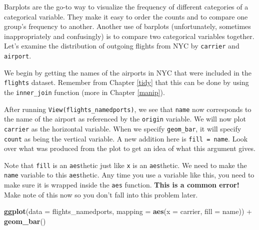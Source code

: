 \documentclass[]{tufte-book}
\newenvironment{Shaded}{\begin{snugshade}}{\end{snugshade}}
\newcommand{\KeywordTok}[1]{\textcolor[rgb]{0.13,0.29,0.53}{\textbf{{#1}}}}
\newcommand{\DataTypeTok}[1]{\textcolor[rgb]{0.13,0.29,0.53}{{#1}}}
\newcommand{\StringTok}[1]{\textcolor[rgb]{0.31,0.60,0.02}{{#1}}}
\newcommand{\NormalTok}[1]{{#1}}
\theoremstyle{definition}
\theoremstyle{definition}
\theoremstyle{remark}
\begin{document}
Barplots are the go-to way to visualize the frequency of different
categories of a categorical variable. They make it easy to order the
counts and to compare one group's frequency to another. Another use of
barplots (unfortunately, sometimes inappropriately and confusingly) is
to compare two categorical variables together. Let's examine the
distribution of outgoing flights from NYC by \texttt{carrier} and
\texttt{airport}.

We begin by getting the names of the airports in NYC that were included
in the \texttt{flights} dataset. Remember from Chapter \ref{tidy} that
this can be done by using the \texttt{inner\_join} function (more in
Chapter \ref{manip}).

\begin{Shaded}
\end{Shaded}

After running \texttt{View(flights\_namedports)}, we see that
\texttt{name} now corresponds to the name of the airport as referenced
by the \texttt{origin} variable. We will now plot \texttt{carrier} as
the horizontal variable. When we specify \texttt{geom\_bar}, it will
specify \texttt{count} as being the vertical variable. A new addition
here is \texttt{fill\ =\ name}. Look over what was produced from the
plot to get an idea of what this argument gives.

Note that \texttt{fill} is an \texttt{aes}thetic just like \texttt{x} is
an \texttt{aes}thetic. We need to make the \texttt{name} variable to
this \texttt{aes}thetic. Any time you use a variable like this, you need
to make sure it is wrapped inside the \texttt{aes} function.
\textbf{This is a common error!} Make note of this now so you don't fall
into this problem later.

\begin{Shaded}
\begin{Highlighting}[]
\KeywordTok{ggplot}\NormalTok{(}\DataTypeTok{data =} \NormalTok{flights_namedports, }\DataTypeTok{mapping =} \KeywordTok{aes}\NormalTok{(}\DataTypeTok{x =} \NormalTok{carrier, }\DataTypeTok{fill =} \NormalTok{name)) +}
\StringTok{  }\KeywordTok{geom_bar}\NormalTok{()}
\end{Highlighting}
\end{Shaded}
\end{document}
